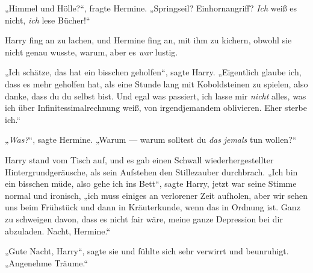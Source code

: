 „Himmel und Hölle?“, fragte Hermine.
„Springseil? Einhornangriff? \emph{Ich} weiß es nicht, \emph{ich} lese Bücher!“

Harry fing an zu lachen, und Hermine fing an, mit ihm zu kichern, obwohl sie nicht genau wusste, warum, aber es \emph{war} lustig.

„Ich schätze, das hat ein bisschen geholfen“, sagte Harry.
„Eigentlich glaube ich, dass es mehr geholfen hat, als eine Stunde lang mit Koboldsteinen zu spielen, also danke, dass du du selbst bist. Und egal was passiert, ich lasse mir \emph{nicht} alles, was ich über Infinitessimalrechnung weiß, von irgendjemandem oblivieren. Eher sterbe ich.“

„\emph{Was?}“, sagte Hermine.
„Warum — warum solltest du \emph{das} \emph{jemals} tun wollen?“

Harry stand vom Tisch auf, und es gab einen Schwall wiederhergestellter Hintergrundgeräusche, als sein Aufstehen den Stillezauber durchbrach.
„Ich bin ein bisschen müde, also gehe ich ins Bett“, sagte Harry, jetzt war seine Stimme normal und ironisch, „ich muss einiges an verlorener Zeit aufholen, aber wir sehen uns beim Frühstück und dann in Kräuterkunde, wenn das in Ordnung ist. Ganz zu schweigen davon, dass es nicht fair wäre, meine ganze Depression bei dir abzuladen. Nacht, Hermine.“

„Gute Nacht, Harry“, sagte sie und fühlte sich sehr verwirrt und beunruhigt.
„Angenehme Träume.“

